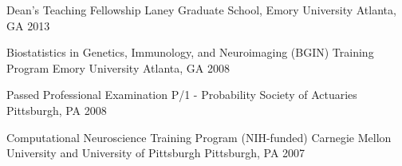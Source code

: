 




\begin{cvhonors}


\cvhonor
{Dean’s Teaching Fellowship} %
{Laney Graduate School, Emory University} %
{Atlanta, GA} %
{2013} %


\cvhonor
{Biostatistics in Genetics, Immunology, and Neuroimaging (BGIN) Training Program} %
{Emory University} %
{Atlanta, GA} %
{2008} %

\cvhonor
{Passed Professional Examination P/1 - Probability} %
{Society of Actuaries} %
{Pittsburgh, PA} %
{2008} %

\cvhonor
{Computational Neuroscience Training Program (NIH-funded)} %
{Carnegie Mellon University and University of Pittsburgh} %
{Pittsburgh, PA} %
{2007} %




\end{cvhonors}


